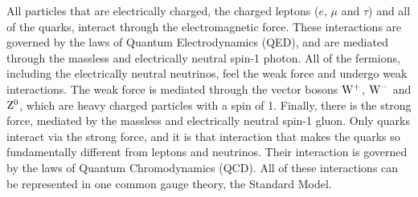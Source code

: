All particles that are electrically charged, the charged leptons ($e$, $\mu$ and $\tau$) and all of the quarks, interact through the electromagnetic force. These interactions are governed by the laws of Quantum Electrodynamics (QED), and are mediated through the massless and electrically neutral spin-1 photon. All of the fermions, including the electrically neutral neutrinos, feel the weak force and undergo weak interactions. The weak force is mediated through the vector bosons $\mathrm{W}^+$, $\mathrm{W}^-$ and $\mathrm{Z}^0$, which are heavy charged particles with a spin of 1. Finally, there is the strong force, mediated by the massless and electrically neutral spin-1 gluon. Only quarks interact via the strong force, and it is that interaction that makes the quarks so fundamentally different from leptons and neutrinos. Their interaction is governed by the laws of Quantum Chromodynamics (QCD). All of these interactions can be represented in one common gauge theory, the Standard Model.


